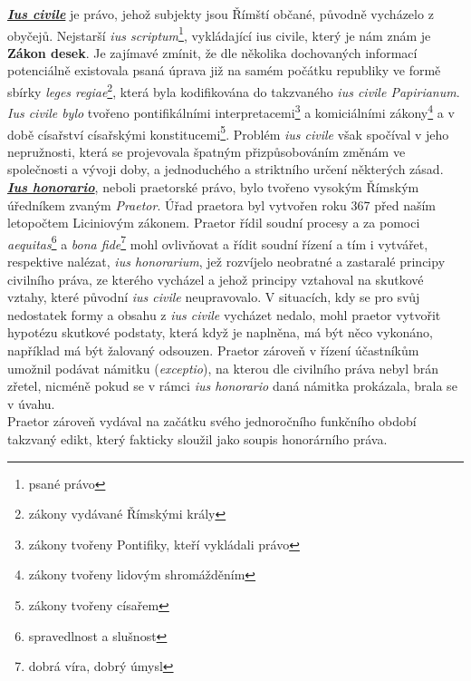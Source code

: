 \documentclass{article}
\begin{document}
\underline{\textbf{\textit{Ius civile}}} je právo, jehož subjekty jsou Římští občané, původně vycházelo z obyčejů. Nejstarší \textit{ius scriptum}\footnote{psané právo}, vykládající ius civile, který je nám znám je \textbf{Zákon \MakeUppercase{} desek}. Je zajímavé zmínit, že dle několika dochovaných informací potenciálně existovala psaná úprava již na samém počátku republiky ve formě sbírky \textit{leges regiae}\footnote{zákony vydávané Římskými krály}, která byla kodifikována do takzvaného \textit{ius civile Papirianum}. \textit{Ius civile bylo} tvořeno pontifikálními interpretacemi\footnote{zákony tvořeny Pontifiky, kteří vykládali právo} a komiciálními zákony\footnote{zákony tvořeny lidovým shromážděním} a v době císařství císařskými konstitucemi\footnote{zákony tvořeny císařem}. Problém \textit{ius civile} však spočíval v jeho nepružnosti, která se projevovala špatným přizpůsobováním změnám ve společnosti a vývoji doby, a jednoduchého a striktního určení některých zásad. \\

\underline{\textbf{\textit{Ius honorario}}}, neboli praetorské právo, bylo tvořeno vysokým Římským úředníkem zvaným \textit{Praetor}. Úřad praetora byl vytvořen roku 367 před naším letopočtem Liciniovým zákonem. Praetor řídil soudní procesy a za pomoci \textit{aequitas}\footnote{spravedlnost a slušnost} a \textit{bona fide}\footnote{dobrá víra, dobrý úmysl} mohl ovlivňovat a řídit soudní řízení a tím i vytvářet, respektive nalézat, \textit{ius honorarium}, jež rozvíjelo neobratné a zastaralé principy civilního práva, ze kterého vycházel a jehož principy vztahoval na skutkové vztahy, které původní \textit{ius civile} neupravovalo. V situacích, kdy se pro svůj nedostatek formy a obsahu z \textit{ius civile} vycházet nedalo, mohl praetor vytvořit hypotézu skutkové podstaty, která když je naplněna, má být něco vykonáno, například má být žalovaný odsouzen. Praetor zároveň v řízení účastníkům umožnil podávat námitku (\textit{exceptio}), na kterou dle civilního práva nebyl brán zřetel, nicméně pokud se v rámci \textit{ius honorario} daná námitka prokázala, brala se v úvahu. \\

Praetor zároveň vydával na začátku svého jednoročního funkčního období takzvaný edikt, který fakticky sloužil jako soupis honorárního práva. 
\end{document}

